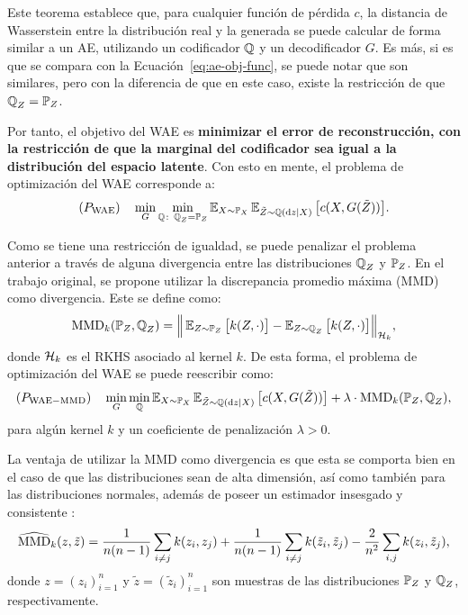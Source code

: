 Este teorema establece que, para cualquier función de pérdida $c$, la distancia de Wasserstein entre la distribución real y la generada se puede calcular de forma similar a un AE, utilizando un codificador $\ProbQ$ y un decodificador $G$. Es más, si es que se compara con la Ecuación~\eqref{eq:ae-obj-func}, se puede notar que son similares, pero con la diferencia de que en este caso, existe la restricción de que $\ProbQ_Z = \Prob_Z$.

Por tanto, el objetivo del WAE es \textbf{minimizar el error de reconstrucción, con la restricción de que la marginal del codificador sea igual a la distribución del espacio latente}. Con esto en mente, el problema de optimización del WAE corresponde a:
\begin{equation}
	(P_{\mathrm{WAE}}) \quad \min_{G} \min_{\ProbQ\colon \ProbQ_Z = \Prob_Z} \Exp_{X\sim\Prob_X} \Exp_{\tilde Z\sim\ProbQ(\dd z \mid X)} \qty\big[ c(X, G(\tilde Z)) ].
\end{equation}

Como se tiene una restricción de igualdad, se puede penalizar el problema anterior a través de alguna divergencia entre las distribuciones $\ProbQ_Z$ y $\Prob_Z$. En el trabajo original, se propone utilizar la discrepancia promedio máxima (MMD) \cite{gretton2006kernel} como divergencia. Este se define como:
\begin{equation}
	\MMDOp_k(\Prob_Z, \ProbQ_Z) = \Big\|
	\Exp_{Z\sim\Prob_Z} \qty\big[ k(Z, \cdot) ] - \Exp_{Z\sim\ProbQ_Z} \qty\big[ k(Z, \cdot) ]
	\Big\|_{\cH_k},
\end{equation}
donde $\mathcal{H}_k$ es el RKHS asociado al kernel $k$. De esta forma, el problema de optimización del WAE se puede reescribir como:
\begin{equation}
	(P_{\mathrm{WAE-MMD}}) \quad \min_{G} \min_{\ProbQ} \Exp_{X\sim\Prob_X} \Exp_{\tilde Z\sim\ProbQ(\dd z \mid X)} \qty\big[ c(X, G(\tilde Z)) ] + \lambda \cdot \MMDOp_{k}(\Prob_Z, \ProbQ_Z),
\end{equation}
para algún kernel $k$ y un coeficiente de penalización $\lambda > 0$.

La ventaja de utilizar la MMD como divergencia es que esta se comporta bien en el caso de que las distribuciones sean de alta dimensión, así como también para las distribuciones normales, además de poseer un estimador insesgado y consistente \cite{gretton2012kernel}:
\begin{equation}
	\widehat {\operatorname{MMD}}_k(z, \tilde z)
	= \frac{1}{n(n-1)} \sum_{i\neq j} k(z_i, z_j)
	+ \frac{1}{n(n-1)} \sum_{i\neq j} k(\tilde z_i, \tilde z_j)
	- \frac{2}{n^2} \sum_{i, j} k(z_i, \tilde z_j),
\end{equation}
donde $z = (z_i)_{i=1}^{n}$ y $\tilde z = (\tilde z_i)_{i=1}^{n}$ son muestras de las distribuciones $\Prob_Z$ y $\ProbQ_Z$, respectivamente.

